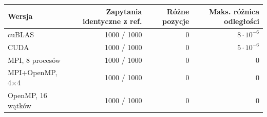 \begin{tabular}{lrrr}
\toprule
Wersja & Zapytania identyczne z ref. & Różne pozycje & Maks. różnica odległości \\
\midrule
cuBLAS & 1000 / 1000 & 0 & $8\cdot 10^{-6}$ \\
CUDA & 1000 / 1000 & 0 & $5\cdot 10^{-6}$ \\
MPI, 8 procesów & 1000 / 1000 & 0 & $0$ \\
MPI+OpenMP, 4×4 & 1000 / 1000 & 0 & $0$ \\
OpenMP, 16 wątków & 1000 / 1000 & 0 & $0$ \\
\bottomrule
\end{tabular}
